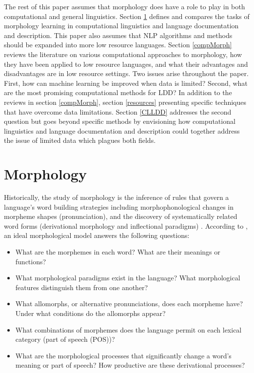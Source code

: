 \documentclass[12pt]{article}
\begin{document}
The rest of this paper assumes that morphology does have a role to play in both computational and general linguistics. Section \ref{tasks} defines and compares the tasks of morphology learning in computational linguistics and language documentation and description. This paper also assumes that NLP algorithms and methods should be expanded into more low resource languages. Section \ref{compMorph} reviews the literature on various computational approaches to morphology, how they have been applied to low resource languages, and what their advantages and disadvantages are in low resource settings. Two issues arise throughout the paper. First, how can machine learning be improved when data is limited? Second, what are the most promising computational methods for LDD? In addition to the reviews in section \ref{compMorph}, section \ref{resources} presenting specific techniques that have overcome data limitations. Section \ref{CLLDD} addresses the second question but goes beyond specific methods by envisioning how computational linguistics and language documentation and description could together address the issue of limited data which plagues both fields.

\section{Morphology}
\label{tasks}

Historically, the study of morphology is the inference of rules that govern a language’s word building strategies including morphophonological changes in morpheme shapes (pronunciation), and the discovery of systematically related word forms (derivational morphology and inflectional paradigms) \cite{roark_computational_2007}. According to , an ideal morphological model answers the following questions:\begin{singlespace}

\smallskip
\begin{itemize}
    \item What are the morphemes in each word? What are their meanings or functions? 
    \item What morphological paradigms exist in the language? What morphological features distinguish them from one another?
    \item What allomorphs, or alternative pronunciations, does each morpheme have? Under what conditions do the allomorphs appear?  
    \item What combinations of morphemes does the language permit on each lexical category (part of speech (POS))?
    \item What are the morphological processes that significantly change a word's meaning or part of speech? How productive are these derivational processes?
\end{itemize}
\end{singlespace}
\smallskip
\end{document}
